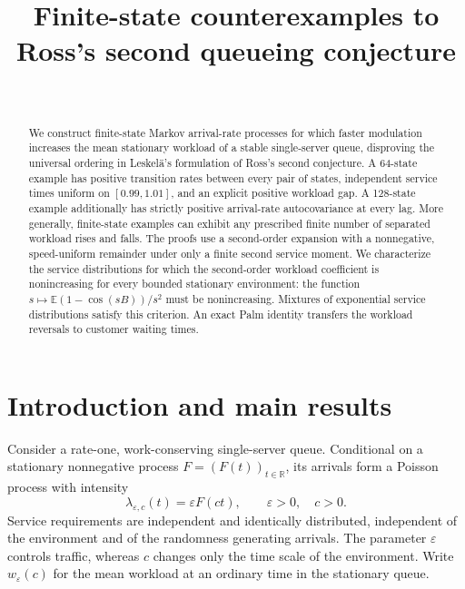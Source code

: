 \documentclass[aap,preprint]{imsart}
\numberwithin{equation}{section}
\theoremstyle{plain}
\theoremstyle{definition}
\newcommand{\E}{\mathbb E}
\newcommand{\R}{\mathbb R}
\newcommand{\1}{\mathbf 1}
\newcommand{\eps}{\varepsilon}
\begin{document}
\begin{frontmatter}
\title{Finite-state counterexamples to Ross's second queueing conjecture}
\begin{aug}
\author[A]{~}
\address[A]{Einstein Institute of Mathematics, The Hebrew University of Jerusalem}
\end{aug}
\begin{abstract}
We construct finite-state Markov arrival-rate processes for which faster modulation increases the mean stationary workload of a stable single-server queue, disproving the universal ordering in Leskel\"a's formulation of Ross's second conjecture. A 64-state example has positive transition rates between every pair of states, independent service times uniform on $[0.99,1.01]$, and an explicit positive workload gap. A 128-state example additionally has strictly positive arrival-rate autocovariance at every lag. More generally, finite-state examples can exhibit any prescribed finite number of separated workload rises and falls. The proofs use a second-order expansion with a nonnegative, speed-uniform remainder under only a finite second service moment. We characterize the service distributions for which the second-order workload coefficient is nonincreasing for every bounded stationary environment: the function $s\mapsto\E(1-\cos(sB))/s^2$ must be nonincreasing. Mixtures of exponential service distributions satisfy this criterion. An exact Palm identity transfers the workload reversals to customer waiting times.
\end{abstract}
\begin{keyword}[class=MSC]
\end{keyword}
\begin{keyword}
\end{keyword}
\end{frontmatter}

\section{Introduction and main results}\label{sec:intro}
Consider a rate-one, work-conserving single-server queue. Conditional on a stationary nonnegative process $F=(F(t))_{t\in\R}$, its arrivals form a Poisson process with intensity
\begin{equation}\label{eq:arrival}
 \lambda_{\eps,c}(t)=\eps F(ct),\qquad \eps>0,\quad c>0.
\end{equation}
Service requirements are independent and identically distributed, independent of the environment and of the randomness generating arrivals. The parameter $\eps$ controls traffic, whereas $c$ changes only the time scale of the environment. Write $w_\eps(c)$ for the mean workload at an ordinary time in the stationary queue.
\end{document}
